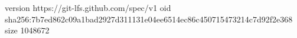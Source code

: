 version https://git-lfs.github.com/spec/v1
oid sha256:7b7ed862c09a1bad2927d311131e04ee6514ec86c450715473214c7d92f2e368
size 1048672
